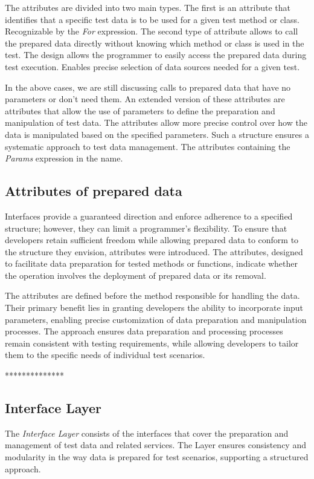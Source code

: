 The attributes are divided into two main types. The first is an attribute that identifies that a specific test data is to be used for a given test method or class. Recognizable by the \textit{For} expression. The second type of attribute allows to call the prepared data directly without knowing which method or class is used in the test. The design allows the programmer to easily access the prepared data during test execution. Enables precise selection of data sources needed for a given test.

In the above cases, we are still discussing calls to prepared data that have no parameters or don't need them. An extended version of these attributes are attributes that allow the use of parameters to define the preparation and manipulation of test data. The attributes allow more precise control over how the data is manipulated based on the specified parameters.  Such a structure ensures a systematic approach to test data management. The attributes containing the \textit{Params} expression in the name.

\subsection*{Attributes of prepared data}

Interfaces provide a guaranteed direction and enforce adherence to a specified structure; however, they can limit a programmer’s flexibility. To ensure that developers retain sufficient freedom while allowing prepared data to conform to the structure they envision, attributes were introduced. The attributes, designed to facilitate data preparation for tested methods or functions, indicate whether the operation involves the deployment of prepared data or its removal.

The attributes are defined before the method responsible for handling the data. Their primary benefit lies in granting developers the ability to incorporate input parameters, enabling precise customization of data preparation and manipulation processes.
The approach ensures data preparation and processing processes remain consistent with testing requirements, while allowing developers to tailor them to the specific needs of individual test scenarios.

**************
\subsection{Interface Layer}
The \textit{Interface Layer} consists of the interfaces that cover the preparation and management of test data and related services. The Layer ensures consistency and modularity in the way data is prepared for test scenarios, supporting a structured approach.


